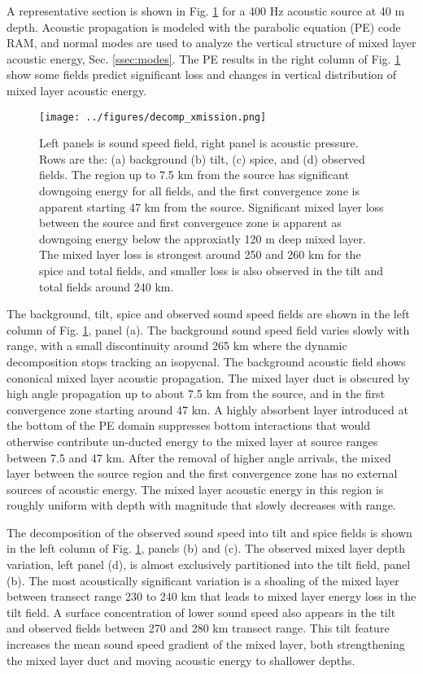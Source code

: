 \documentclass[preprint,NumberedRefs]{JASA}
\begin{document}
A representative section is shown in Fig. \ref{fig:decomp_x} for a 400 Hz acoustic source at 40 m depth. Acoustic propagation is modeled with the parabolic equation (PE) code RAM, and normal modes are used to analyze the vertical structure of mixed layer acoustic energy, Sec. \ref{ssec:modes}. The PE results in the right column of Fig. \ref{fig:decomp_x} show some fields predict significant loss and changes in vertical distribution of mixed layer acoustic energy.

\begin{figure}
\texttt{[image: ../figures/decomp\_xmission.png]}
    \caption{\label{fig:decomp_x}{Left panels is sound speed field, right panel is acoustic pressure. Rows are the: (a) background (b) tilt, (c) spice, and (d) observed fields. The region up to 7.5 km from the source has significant downgoing energy for all fields, and the first convergence zone is apparent starting 47 km from the source. Significant mixed layer loss between the source and first convergence zone is apparent as downgoing energy below the approxiatly 120 m deep mixed layer. The mixed layer loss is strongest around 250 and 260 km for the spice and total fields, and smaller loss is also observed in the tilt and total fields around 240 km.}}
\end{figure}

The background, tilt, spice and observed sound speed fields are shown in the left column of Fig. \ref{fig:decomp_x}, panel (a). The background sound speed field varies slowly with range, with a small discontinuity around 265 km where the dynamic decomposition stops tracking an isopycnal. The background acoustic field shows cononical mixed layer acoustic propagation. The mixed layer duct is obscured by high angle propagation up to about 7.5 km from the source, and in the first convergence zone starting around 47 km. A highly absorbent layer introduced at the bottom of the PE domain suppresses bottom interactions that would otherwise contribute un-ducted energy to the mixed layer at source ranges between 7.5 and 47 km. After the removal of higher angle arrivals, the mixed layer between the source region and the first convergence zone has no external sources of acoustic energy. The mixed layer acoustic energy in this region is roughly uniform with depth with magnitude that slowly decreases with range.

The decomposition of the observed sound speed into tilt and spice fields is shown in the left column of Fig. \ref{fig:decomp_x}, panels (b) and (c). The observed mixed layer depth variation, left panel (d), is almost exclusively partitioned into the tilt field, panel (b). The most acoustically significant variation is a shoaling of the mixed layer between transect range 230 to 240 km that leads to mixed layer energy loss in the tilt field. A surface concentration of lower sound speed also appears in the tilt and observed fields between 270 and 280 km transect range. This tilt feature increases the mean sound speed gradient of the mixed layer, both strengthening the mixed layer duct and moving acoustic energy to shallower depths.
\end{document}
